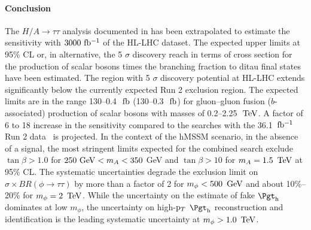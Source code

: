 \FloatBarrier

\paragraph{Conclusion}
\label{sec:conclusion}
The $H/A \to \tau\tau$ analysis documented in \cite{ATLASRun2Ditau} has been extrapolated to estimate the sensitivity with $3000~\mbox{fb$^{-1}$}$ of the HL-LHC dataset. The expected upper limits at 95\% CL or, in alternative, the 5 $\sigma$ discovery reach in terms of cross section for the production of scalar bosons times the branching fraction to ditau final states have been estimated. The region with 5 $\sigma$ discovery potential at HL-LHC extends significantly below the currently expected Run 2 exclusion region. The expected limits are in the range 130--0.4~${\,{\rm fb}}$ (130--0.3~${\,{\rm fb}}$) for gluon--gluon fusion ($b$-associated) production of scalar bosons with masses of 0.2--2.25~$\,\text{Te\hspace{-.08em}V}$. A factor of 6 to 18 increase in the sensitivity compared to the searches with the 36.1~$\mbox{fb$^{-1}$}$ Run 2 data~\cite{ATLASRun2Ditau} is projected. In the context of the hMSSM scenario, in the absence of a signal, the most stringent limits expected for the combined search exclude $\tan\beta > 1.0$ for $250~{\rm{GeV}} < m_A < 350$ \si{\GeV} and $\tan\beta > 10$ for $m_A = 1.5~\,\text{Te\hspace{-.08em}V}$ at 95\% CL\@. The systematic uncertainties degrade the exclusion limit on $\sigma\times BR(\phi\to\tau\tau)$ by more than a factor of 2 for $m_\phi<500~\,\text{Ge\hspace{-.08em}V}$ and about 10\%--20\% for $m_\phi= 2~\,\text{Te\hspace{-.08em}V}$. While the uncertainty on the estimate of fake $\tauhad$ dominates at low $m_{\phi}$, the uncertainty on high-$\mathrm{p}_{T}$ $\tauhad$ reconstruction and identification is the leading systematic uncertainty at $m_\phi > 1.0~\,\text{Te\hspace{-.08em}V}$.
